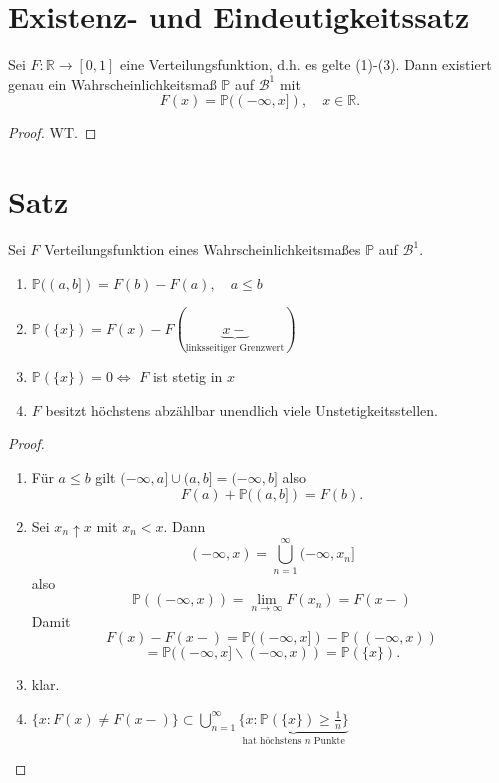 \documentclass[a4paper,11pt,notitlepage]{report}
\newcommand{\R}{{\ensuremath{\mathbb{R}}}}
\newcommand{\Prim}{{\ensuremath{\mathbb{P}}}}
\begin{document}
\section{Existenz- und Eindeutigkeitssatz}
Sei $F \colon \R \rightarrow [0,1]$ eine Verteilungsfunktion, d.h.
es gelte (1)-(3). Dann existiert genau ein Wahrscheinlichkeitsmaß $\Prim$ auf $\mathcal{B}^1$ mit
$$F(x) = \Prim((- \infty, x]), \quad x \in \R.$$

\begin{proof}
	WT.
\end{proof}

\section{Satz}
Sei $F$ Verteilungsfunktion eines Wahrscheinlichkeitsmaßes $\Prim$ auf $\mathcal{B}^1.$
\begin{enumerate}
	\item $\Prim((a,b]) = F(b) - F(a), \quad a \leq b$
	\item $\Prim(\{x\}) = F(x) - F(\underbrace{x-}_{\text{linksseitiger Grenzwert}})$
	\item $\Prim(\{x\}) = 0 \Leftrightarrow$ $F$ ist stetig in $x$
	\item $F$ besitzt höchstens abzählbar unendlich viele Unstetigkeitsstellen.
\end{enumerate}

\begin{proof}
	\begin{enumerate}
		\item Für $a \leq b$ gilt $(- \infty, a] \cup (a,b] = (- \infty, b]$ also
		$$F(a) + \Prim((a,b]) = F(b).$$
		\item Sei $x_n \uparrow x$ mit $x_n < x$. Dann
		$$(- \infty, x) = \bigcup\limits_{n=1}^\infty{(- \infty, x_n]}$$
		also
		$$\Prim((- \infty, x)) = \lim\limits_{n \rightarrow \infty}{F(x_n)} = F(x-)$$
		Damit
		$$F(x) - F(x-) = \Prim((- \infty, x]) - \Prim((- \infty, x))$$
		$$= \Prim((- \infty, x] \backslash (- \infty, x)) = \Prim(\{x\}).$$
		\item klar.
		\item $\{x \colon F(x) \neq F(x-) \} \subset \bigcup\limits_{n = 1}^{\infty}{ \underbrace{\{x \colon \Prim(\{x\}) \geq \frac{1}{n} \}}_{\text{hat höchstens $n$ Punkte}}}$
	\end{enumerate}
\end{proof}
\end{document}
